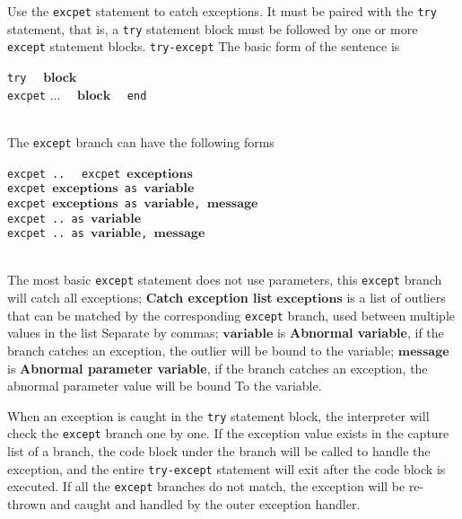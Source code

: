 Use the \texttt{excpet} statement to catch exceptions. It must be paired with the \texttt{try} statement, that is, a \texttt{try} statement block must be followed by one or more \texttt{except} statement blocks. \texttt{try-except} The basic form of the sentence is
\begin{algorithm}
    \texttt{try} \ \
        \qquad $\bm{block}$ \\
    \texttt{excpet} $\bm{...}$ \ \
        \qquad $\bm{block}$ \ \
    \texttt{end}
\end{algorithm}\vspace{-0.6em}\\
The \texttt{except} branch can have the following forms
\begin{algorithm}
    \texttt{excpet ..} \ \
    \texttt{excpet }$\bm{exceptions}$ \\
    \texttt{excpet }$\bm{exceptions}$\texttt{ as }$\bm{variable}$ \\
    \texttt{excpet }$\bm{exceptions}$\texttt{ as }$\bm{variable}$\texttt{, }$\bm{message}$ \\
    \texttt{excpet .. as }$\bm{variable}$ \\
    \texttt{excpet .. as }$\bm{variable}$\texttt{, }$\bm{message}$ \\
\end{algorithm}\vspace{-0.6em}\\
The most basic \texttt{except} statement does not use parameters, this \texttt{except} branch will catch all exceptions; \textbf{Catch exception list} $\bm{exceptions}$ is a list of outliers that can be matched by the corresponding \texttt{except} branch, used between multiple values   in the list Separate by commas; $\bm{variable}$ is \textbf{Abnormal variable}, if the branch catches an exception, the outlier will be bound to the variable; $\bm{message}$ is \textbf{Abnormal parameter variable}, if the branch catches an exception, the abnormal parameter value will be bound To the variable.

When an exception is caught in the \texttt{try} statement block, the interpreter will check the \texttt{except} branch one by one. If the exception value exists in the capture list of a branch, the code block under the branch will be called to handle the exception, and the entire \texttt{try-except} statement will exit after the code block is executed. If all the \texttt{except} branches do not match, the exception will be re-thrown and caught and handled by the outer exception handler.